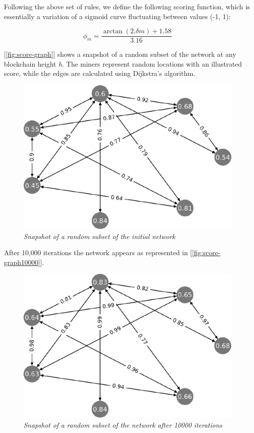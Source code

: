 \documentclass[UTF8, 10pt, nonatbib, nocopyrightspace, reprint]{sigplanconf}
\newcommand{\figref}[1]{[\autoref{#1}]}
\begin{document}
Following the above set of rules, we define the following scoring function, which is essentially a variation of a sigmoid curve fluctuating between values (-1, 1):

\begin{equation*} \label{score}
        \phi_m = \frac{\arctan(2.\delta{m}) + 1.58}{3.16}
\end{equation*}


\figref{fig:score-graph} shows a snapshot of a random subset of the network at any blockchain height \textit{h}. The miners represent random locations with an illustrated score, while the edges are calculated using Dijkstra's algorithm\cite{dijkstra}.

\begin{figure}[ht]
    \begin{center}
          \includegraphics[width=0.8\columnwidth]{chart.eps}
          \caption{\emph{Snapshot of a random subset of the initial network}}
          \label{fig:score-graph}
     \end{center}
\end{figure}

After 10,000 iterations the network appears as represented in \figref{fig:score-graph10000}.

\begin{figure}[ht]
    \begin{center}
          \includegraphics[width=0.8\columnwidth]{chart1000.eps}
          \caption{\emph{Snapshot of a random subset of the network after 10000 iterations}}
          \label{fig:score-graph10000}
     \end{center}
\end{figure}
\end{document}

